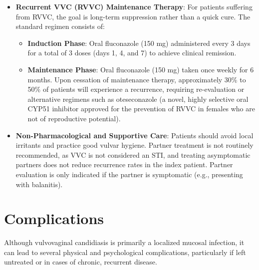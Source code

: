 \begin{itemize}
\begin{itemize}
        \item \textbf{Non-albicans Infections}: Non-\textit{albicans} species, particularly \textit{Candida glabrata}, are relatively resistant to standard azole therapies. First-line treatment for symptomatic \textit{C. glabrata} VVC is intravaginal boric acid (600 mg in a gelatin capsule) administered daily at bedtime for 14 days. Other options include topical flucytosine or amphotericin B creams, which are typically compounded.
    \end{itemize}
    \item \textbf{Recurrent VVC (RVVC) Maintenance Therapy}: For patients suffering from RVVC, the goal is long-term suppression rather than a quick cure. The standard regimen consists of:
    \begin{itemize}
        \item \textbf{Induction Phase}: Oral fluconazole (150 mg) administered every 3 days for a total of 3 doses (days 1, 4, and 7) to achieve clinical remission.
        \item \textbf{Maintenance Phase}: Oral fluconazole (150 mg) taken once weekly for 6 months. Upon cessation of maintenance therapy, approximately 30\% to 50\% of patients will experience a recurrence, requiring re-evaluation or alternative regimens such as oteseconazole (a novel, highly selective oral CYP51 inhibitor approved for the prevention of RVVC in females who are not of reproductive potential).
    \end{itemize}
    \item \textbf{Non-Pharmacological and Supportive Care}: Patients should avoid local irritants and practice good vulvar hygiene. Partner treatment is not routinely recommended, as VVC is not considered an STI, and treating asymptomatic partners does not reduce recurrence rates in the index patient. Partner evaluation is only indicated if the partner is symptomatic (e.g., presenting with balanitis).
\end{itemize}

\section*{Complications}
Although vulvovaginal candidiasis is primarily a localized mucosal infection, it can lead to several physical and psychological complications, particularly if left untreated or in cases of chronic, recurrent disease.

